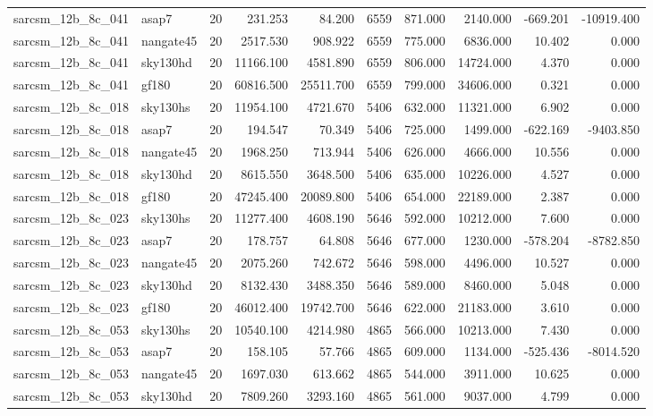 \begin{tabular}{llrrrrrrrr}
sarcsm\_12b\_8c\_041 & asap7 & 20 & 231.253 & 84.200 & 6559 & 871.000 & 2140.000 & -669.201 & -10919.400 \\
sarcsm\_12b\_8c\_041 & nangate45 & 20 & 2517.530 & 908.922 & 6559 & 775.000 & 6836.000 & 10.402 & 0.000 \\
sarcsm\_12b\_8c\_041 & sky130hd & 20 & 11166.100 & 4581.890 & 6559 & 806.000 & 14724.000 & 4.370 & 0.000 \\
sarcsm\_12b\_8c\_041 & gf180 & 20 & 60816.500 & 25511.700 & 6559 & 799.000 & 34606.000 & 0.321 & 0.000 \\
sarcsm\_12b\_8c\_018 & sky130hs & 20 & 11954.100 & 4721.670 & 5406 & 632.000 & 11321.000 & 6.902 & 0.000 \\
sarcsm\_12b\_8c\_018 & asap7 & 20 & 194.547 & 70.349 & 5406 & 725.000 & 1499.000 & -622.169 & -9403.850 \\
sarcsm\_12b\_8c\_018 & nangate45 & 20 & 1968.250 & 713.944 & 5406 & 626.000 & 4666.000 & 10.556 & 0.000 \\
sarcsm\_12b\_8c\_018 & sky130hd & 20 & 8615.550 & 3648.500 & 5406 & 635.000 & 10226.000 & 4.527 & 0.000 \\
sarcsm\_12b\_8c\_018 & gf180 & 20 & 47245.400 & 20089.800 & 5406 & 654.000 & 22189.000 & 2.387 & 0.000 \\
sarcsm\_12b\_8c\_023 & sky130hs & 20 & 11277.400 & 4608.190 & 5646 & 592.000 & 10212.000 & 7.600 & 0.000 \\
sarcsm\_12b\_8c\_023 & asap7 & 20 & 178.757 & 64.808 & 5646 & 677.000 & 1230.000 & -578.204 & -8782.850 \\
sarcsm\_12b\_8c\_023 & nangate45 & 20 & 2075.260 & 742.672 & 5646 & 598.000 & 4496.000 & 10.527 & 0.000 \\
sarcsm\_12b\_8c\_023 & sky130hd & 20 & 8132.430 & 3488.350 & 5646 & 589.000 & 8460.000 & 5.048 & 0.000 \\
sarcsm\_12b\_8c\_023 & gf180 & 20 & 46012.400 & 19742.700 & 5646 & 622.000 & 21183.000 & 3.610 & 0.000 \\
sarcsm\_12b\_8c\_053 & sky130hs & 20 & 10540.100 & 4214.980 & 4865 & 566.000 & 10213.000 & 7.430 & 0.000 \\
sarcsm\_12b\_8c\_053 & asap7 & 20 & 158.105 & 57.766 & 4865 & 609.000 & 1134.000 & -525.436 & -8014.520 \\
sarcsm\_12b\_8c\_053 & nangate45 & 20 & 1697.030 & 613.662 & 4865 & 544.000 & 3911.000 & 10.625 & 0.000 \\
sarcsm\_12b\_8c\_053 & sky130hd & 20 & 7809.260 & 3293.160 & 4865 & 561.000 & 9037.000 & 4.799 & 0.000 \\

\end{tabular}

